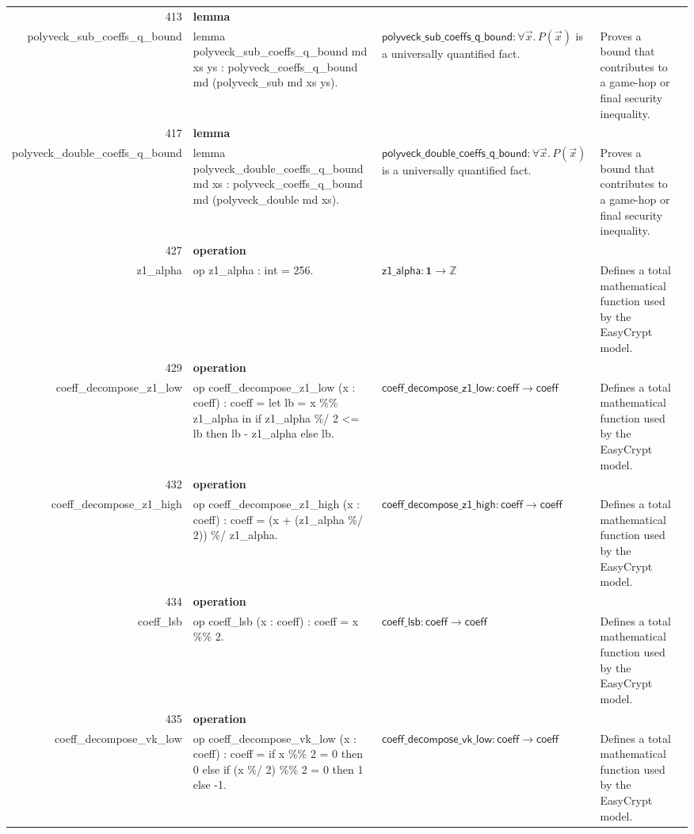 \documentclass[10pt]{article}
\newcommand{\ec}[1]{\begingroup\ttfamily\scriptsize #1\endgroup}
\begin{document}
\begin{longtable}{r L{0.17\textwidth} L{0.26\textwidth} L{0.27\textwidth} L{0.20\textwidth}}
413 & \textbf{lemma}\\\ec{polyveck\_sub\_coeffs\_q\_bound} & \ec{lemma polyveck\_sub\_coeffs\_q\_bound md xs ys : polyveck\_coeffs\_q\_bound md (polyveck\_sub md xs ys).} & \(\mathsf{polyveck\_sub\_coeffs\_q\_bound} : \forall \vec{x}.\, P(\vec{x})\) is a universally quantified fact. & Proves a bound that contributes to a game-hop or final security inequality. \\
417 & \textbf{lemma}\\\ec{polyveck\_double\_coeffs\_q\_bound} & \ec{lemma polyveck\_double\_coeffs\_q\_bound md xs : polyveck\_coeffs\_q\_bound md (polyveck\_double md xs).} & \(\mathsf{polyveck\_double\_coeffs\_q\_bound} : \forall \vec{x}.\, P(\vec{x})\) is a universally quantified fact. & Proves a bound that contributes to a game-hop or final security inequality. \\
427 & \textbf{operation}\\\ec{z1\_alpha} & \ec{op z1\_alpha : int = 256.} & \(\mathsf{z1\_alpha} : \mathbf{1} \to \mathbb{Z}\) & Defines a total mathematical function used by the EasyCrypt model. \\
429 & \textbf{operation}\\\ec{coeff\_decompose\_z1\_low} & \ec{op coeff\_decompose\_z1\_low (x : coeff) : coeff = let lb = x \%\% z1\_alpha in if z1\_alpha \%/ 2 <= lb then lb - z1\_alpha else lb.} & \(\mathsf{coeff\_decompose\_z1\_low} : \mathsf{coeff} \to \mathsf{coeff}\) & Defines a total mathematical function used by the EasyCrypt model. \\
432 & \textbf{operation}\\\ec{coeff\_decompose\_z1\_high} & \ec{op coeff\_decompose\_z1\_high (x : coeff) : coeff = (x + (z1\_alpha \%/ 2)) \%/ z1\_alpha.} & \(\mathsf{coeff\_decompose\_z1\_high} : \mathsf{coeff} \to \mathsf{coeff}\) & Defines a total mathematical function used by the EasyCrypt model. \\
434 & \textbf{operation}\\\ec{coeff\_lsb} & \ec{op coeff\_lsb (x : coeff) : coeff = x \%\% 2.} & \(\mathsf{coeff\_lsb} : \mathsf{coeff} \to \mathsf{coeff}\) & Defines a total mathematical function used by the EasyCrypt model. \\
435 & \textbf{operation}\\\ec{coeff\_decompose\_vk\_low} & \ec{op coeff\_decompose\_vk\_low (x : coeff) : coeff = if x \%\% 2 = 0 then 0 else if (x \%/ 2) \%\% 2 = 0 then 1 else -1.} & \(\mathsf{coeff\_decompose\_vk\_low} : \mathsf{coeff} \to \mathsf{coeff}\) & Defines a total mathematical function used by the EasyCrypt model. \\

\end{longtable}
\end{document}
